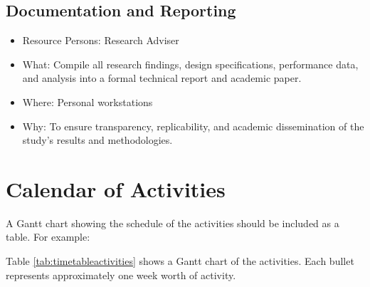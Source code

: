 \subsection{Documentation and Reporting}
\begin{itemize}
	\item Resource Persons: Research Adviser
	\item What: Compile all research findings, design specifications, performance data, and analysis into a formal technical report and academic paper.
	\item Where: Personal workstations
	\item Why: To ensure transparency, replicability, and academic dissemination of the study’s results and methodologies.
\end{itemize}

\section{Calendar of Activities}

A Gantt chart showing the schedule of the activities should be included as a table. For example:

Table \ref{tab:timetableactivities} shows a Gantt chart of the activities.  Each bullet represents approximately
one week worth of activity.

%
%
\newcommand{\weekone}{\textbullet}
\newcommand{\weektwo}{\textbullet \textbullet}
\newcommand{\weekthree}{\textbullet \textbullet \textbullet}
\newcommand{\weekfour}{\textbullet \textbullet \textbullet \textbullet}

%
%
\begin{comment}
   \newcommand{\weekone}{$\star$}
   \newcommand{\weektwo}{$\star \star$}
   \newcommand{\weekthree}{$\star \star \star$}
   \newcommand{\weekfour}{$\star \star \star \star$ }
\end{comment}



